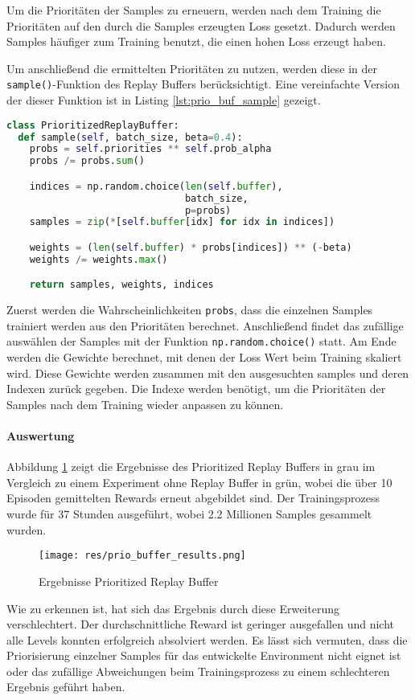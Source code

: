 \documentclass[11pt]{scrartcl}
\begin{document}
Um die Prioritäten der Samples zu erneuern, werden nach dem Training die Prioritäten auf
den durch die Samples erzeugten Loss gesetzt. Dadurch werden Samples häufiger zum
Training benutzt, die einen hohen Loss erzeugt haben.

Um anschließend die ermittelten Prioritäten zu nutzen, werden diese in der
\lstinline!sample()!-Funktion des Replay Buffers berücksichtigt. Eine vereinfachte Version
der dieser Funktion ist in Listing \ref{lst:prio_buf_sample} gezeigt.
\begin{lstlisting}[language=Python, caption=sample()-Funktion des PrioritizedReplayBuffers,
label=lst:prio_buf_sample]
class PrioritizedReplayBuffer:
  def sample(self, batch_size, beta=0.4):
    probs = self.priorities ** self.prob_alpha
    probs /= probs.sum()

    indices = np.random.choice(len(self.buffer),
                               batch_size,
                               p=probs)
    samples = zip(*[self.buffer[idx] for idx in indices])

    weights = (len(self.buffer) * probs[indices]) ** (-beta)
    weights /= weights.max()

    return samples, weights, indices
\end{lstlisting}
\noindent
Zuerst werden die Wahrscheinlichkeiten \lstinline!probs!, dass die einzelnen Samples
trainiert werden aus den Prioritäten berechnet. Anschließend findet das zufällige
auswählen der Samples mit der Funktion \lstinline!np.random.choice()! statt. Am Ende
werden die Gewichte berechnet, mit denen der Loss Wert beim Training skaliert wird. Diese
Gewichte werden zusammen mit den ausgesuchten samples und deren Indexen zurück gegeben.
Die Indexe werden benötigt, um die Prioritäten der Samples nach dem Training wieder
anpassen zu können.

\paragraph*{Auswertung}
Abbildung \ref{fig:prio_buf_results} zeigt die Ergebnisse des Prioritized Replay Buffers
in grau im Vergleich zu einem Experiment ohne Replay Buffer in grün, wobei die über 10
Episoden gemittelten Rewards erneut abgebildet sind. Der Trainingsprozess wurde für 37
Stunden ausgeführt, wobei 2.2 Millionen Samples gesammelt wurden.
\begin{figure}[htp]
\centering
\texttt{[image: res/prio\_buffer\_results.png]}
\caption{Ergebnisse Prioritized Replay Buffer}
\label{fig:prio_buf_results}
\end{figure}
\noindent
Wie zu erkennen ist, hat sich das Ergebnis durch diese Erweiterung verschlechtert. Der
durchschnittliche Reward ist geringer ausgefallen und nicht alle Levels konnten
erfolgreich absolviert werden. Es lässt sich vermuten, dass die Priorisierung einzelner
Samples für das entwickelte Environment nicht eignet ist oder das zufällige Abweichungen
beim Trainingsprozess zu einem schlechteren Ergebnis geführt haben.
\end{document}

